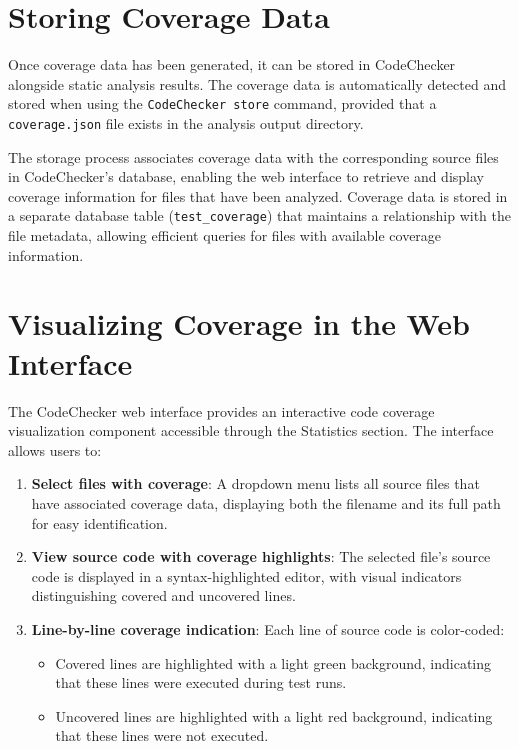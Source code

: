 \section{Storing Coverage Data}

Once coverage data has been generated, it can be stored in CodeChecker alongside static analysis results. The coverage data is automatically detected and stored when using the \texttt{CodeChecker store} command, provided that a \texttt{coverage.json} file exists in the analysis output directory.

The storage process associates coverage data with the corresponding source files in CodeChecker's database, enabling the web interface to retrieve and display coverage information for files that have been analyzed. Coverage data is stored in a separate database table (\texttt{test\_coverage}) that maintains a relationship with the file metadata, allowing efficient queries for files with available coverage information.

\section{Visualizing Coverage in the Web Interface}

The CodeChecker web interface provides an interactive code coverage visualization component accessible through the Statistics section. The interface allows users to:

\begin{enumerate}
    \item \textbf{Select files with coverage}: A dropdown menu lists all source files that have associated coverage data, displaying both the filename and its full path for easy identification.
    \item \textbf{View source code with coverage highlights}: The selected file's source code is displayed in a syntax-highlighted editor, with visual indicators distinguishing covered and uncovered lines.
    \item \textbf{Line-by-line coverage indication}: Each line of source code is color-coded:
    \begin{itemize}
        \item Covered lines are highlighted with a light green background, indicating that these lines were executed during test runs.
        \item Uncovered lines are highlighted with a light red background, indicating that these lines were not executed.
    \end{itemize}
\end{enumerate}

